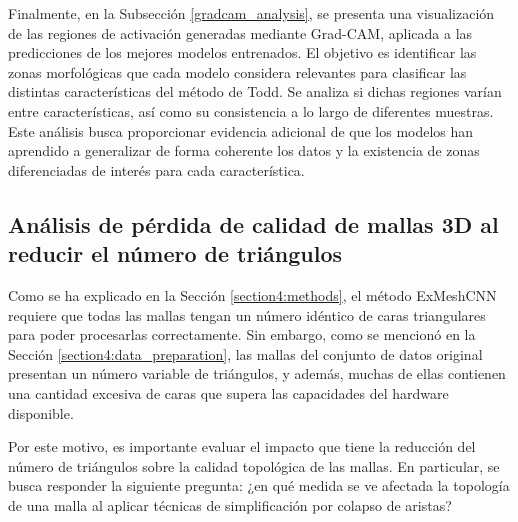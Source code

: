 Finalmente, en la Subsección \ref{gradcam_analysis}, se presenta una visualización de las regiones de activación generadas mediante Grad-CAM, aplicada a las predicciones de los mejores modelos entrenados. El objetivo es identificar las zonas morfológicas que cada modelo considera relevantes para clasificar las distintas características del método de Todd. Se analiza si dichas regiones varían entre características, así como su consistencia a lo largo de diferentes muestras. Este análisis busca proporcionar evidencia adicional de que los modelos han aprendido a generalizar de forma coherente los datos y la existencia de zonas diferenciadas de interés para cada característica.

\subsection{Análisis de pérdida de calidad de mallas 3D al reducir el número de triángulos}
\label{section5:experiment_edge_collapse}
Como se ha explicado en la Sección \ref{section4:methods}, el método ExMeshCNN requiere que todas las mallas tengan un número idéntico de caras triangulares para poder procesarlas correctamente. Sin embargo, como se mencionó en la Sección \ref{section4:data_preparation}, las mallas del conjunto de datos original presentan un número variable de triángulos, y además, muchas de ellas contienen una cantidad excesiva de caras que supera las capacidades del hardware disponible.

Por este motivo, es importante evaluar el impacto que tiene la reducción del número de triángulos sobre la calidad topológica de las mallas. En particular, se busca responder la siguiente pregunta: ¿en qué medida se ve afectada la topología de una malla al aplicar técnicas de simplificación por colapso de aristas?

